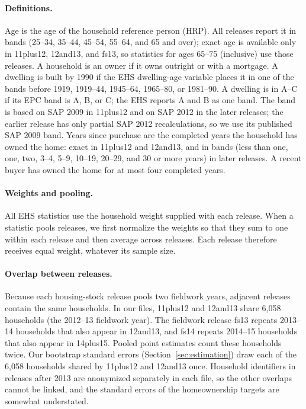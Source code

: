 \paragraph{Definitions.} Age is the age of the household reference person
(HRP). All releases report it in bands (25--34, 35--44, 45--54, 55--64, and
65 and over); exact age is available only in 11plus12, 12and13, and fs13,
so statistics for ages 65--75 (inclusive) use those releases. A household is
an owner if it owns outright or with a mortgage. A dwelling is built by 1990
if the EHS dwelling-age variable places it in one of the bands before 1919,
1919--44, 1945--64, 1965--80, or 1981--90. A dwelling is in A--C if its
EPC band is A, B, or C; the EHS reports A and B as one band. The band is
based on SAP 2009 in 11plus12 and on SAP 2012 in the later releases; the
earlier release has only partial SAP 2012 recalculations, so we use its
published SAP 2009 band. Years since purchase are the completed years the
household has owned the home: exact in 11plus12 and 12and13, and in bands
(less than one, one, two, 3--4, 5--9, 10--19, 20--29, and 30 or more years)
in later releases. A recent buyer has owned the home for at most four
completed years.

\paragraph{Weights and pooling.} All EHS statistics use the household
weight supplied with each release. When a statistic pools releases, we
first normalize the weights so that they sum to one within each release and
then average across releases. Each release therefore receives equal weight,
whatever its sample size.

\paragraph{Overlap between releases.} Because each housing-stock release
pools two fieldwork years, adjacent releases contain the same households.
In our files, 11plus12 and 12and13 share 6,058 households (the 2012--13
fieldwork year). The fieldwork release fs13 repeats 2013--14 households
that also appear in 12and13, and fs14 repeats 2014--15 households that also
appear in 14plus15. Pooled point estimates count these households twice.
Our bootstrap standard errors (Section~\ref{sec:estimation}) draw each of
the 6,058 households shared by 11plus12 and 12and13 once. Household
identifiers in releases after 2013 are anonymized separately in each file,
so the other overlaps cannot be linked, and the standard errors of the
homeownership targets are somewhat understated.

